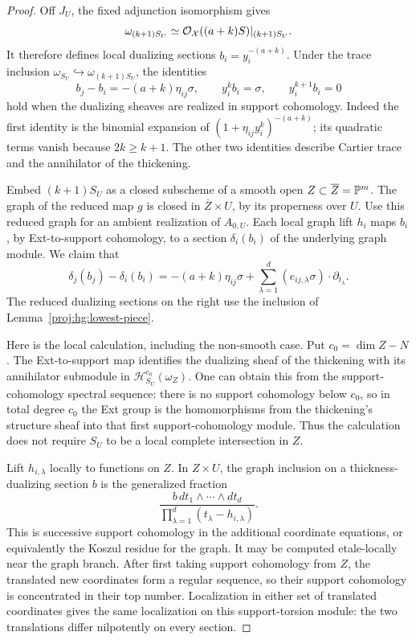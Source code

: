 \begin{proof}
Off \(J_U\), the fixed adjunction isomorphism gives
\[
 \omega_{(k+1)S_U}
 \simeq\mathcal{O}_{\mathcal X}((a+k)S)|_{(k+1)S_U}.
\]
It therefore defines local dualizing sections
\(b_i=y_i^{-(a+k)}\).  Under the trace inclusion
\(\omega_{S_U}\hookrightarrow\omega_{(k+1)S_U}\), the identities
\begin{equation}\label{proj:hg:dualizing-errors}
 b_j-b_i=-(a+k)\eta_{ij}\sigma,\qquad
 y_i^kb_i=\sigma,\qquad y_i^{k+1}b_i=0
\end{equation}
hold when the dualizing sheaves are realized in support
cohomology.  Indeed the first identity is the binomial expansion
of \((1+\eta_{ij}y_i^k)^{-(a+k)}\); its quadratic terms vanish
because \(2k\geq k+1\).  The other two identities describe
Cartier trace and the annihilator of the thickening.

Embed \((k+1)S_U\) as a closed subscheme of a smooth open
\(Z\subset\overline Z=\mathbb{P}^m\).  The graph of the reduced map
\(g\) is closed in \(\overline Z\times U\), by its properness over
\(U\).  Use this reduced graph for an ambient realization of
\(A_{0,U}\).  Each local graph lift \(h_i\) maps \(b_i\), by
Ext-to-support cohomology, to a section \(\delta_i(b_i)\) of the
underlying graph module.  We claim that
\begin{equation}\label{proj:hg:graph-identity}
 \delta_j(b_j)-\delta_i(b_i)
 =
 -(a+k)\eta_{ij}\sigma
 +\sum_{\lambda=1}^d
          (e_{ij,\lambda}\sigma)\cdot\partial_{t_\lambda}.
\end{equation}
The reduced dualizing sections on the right use the inclusion
of Lemma~\ref{proj:hg:lowest-piece}.

Here is the local calculation, including the non-smooth case.
Put \(c_0=\dim Z-N\).
The Ext-to-support map identifies the dualizing sheaf of the
thickening with its annihilator submodule in
\(\mathcal H^{c_0}_{S_U}(\omega_Z)\).  One can obtain this from
the support-cohomology spectral sequence: there is no support
cohomology below \(c_0\), so in total degree \(c_0\) the Ext
group is the homomorphisms from the thickening's structure sheaf
into that first support-cohomology module.  Thus the calculation
does not require \(S_U\) to be a local complete intersection in
\(Z\).

Lift \(h_{i,\lambda}\) locally to functions on \(Z\).  In
\(Z\times U\), the graph inclusion on a thickness-dualizing
section \(b\) is the generalized fraction
\[
 \frac{b\,dt_1\wedge\cdots\wedge dt_d}
      {\prod_{\lambda=1}^d(t_\lambda-h_{i,\lambda})}.
\]
This is successive support cohomology in the additional
coordinate equations, or equivalently the Koszul residue for
the graph.  It may be computed etale-locally near the graph
branch.  After first taking support cohomology from \(Z\), the
translated new coordinates form a regular sequence, so their
support cohomology is concentrated in their top number.
Localization in either set of translated coordinates gives the
same localization on this support-torsion module: the two
translations differ nilpotently on every section.


\end{proof}
